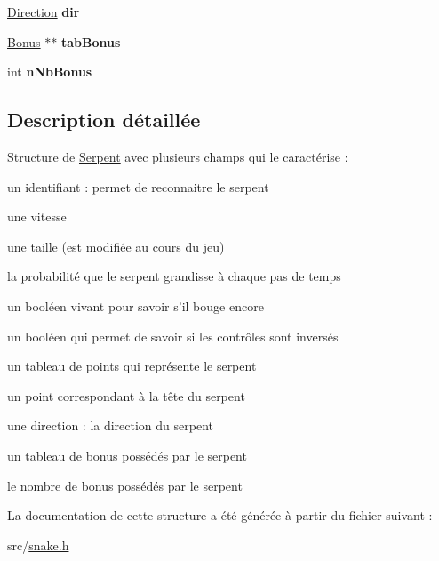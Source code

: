 \begin{DoxyCompactItemize}
\item 
\hypertarget{struct_serpent_a58d94fa8f7ddf189cd6eabdea4f2346c}{\hyperlink{snake_8h_a224b9163917ac32fc95a60d8c1eec3aa}{Direction} {\bfseries dir}}\label{struct_serpent_a58d94fa8f7ddf189cd6eabdea4f2346c}

\item 
\hypertarget{struct_serpent_a5caf2f6b95504582543aadf9250a9f1f}{\hyperlink{struct_bonus}{Bonus} $\ast$$\ast$ {\bfseries tab\-Bonus}}\label{struct_serpent_a5caf2f6b95504582543aadf9250a9f1f}

\item 
\hypertarget{struct_serpent_a8ac28cdfb3bb7a7409393a3e62d83897}{int {\bfseries n\-Nb\-Bonus}}\label{struct_serpent_a8ac28cdfb3bb7a7409393a3e62d83897}

\end{DoxyCompactItemize}


\subsection{Description détaillée}
Structure de \hyperlink{struct_serpent}{Serpent} avec plusieurs champs qui le caractérise \-:
\begin{DoxyItemize}
\item un identifiant \-: permet de reconnaitre le serpent
\item une vitesse
\item une taille (est modifiée au cours du jeu)
\item la probabilité que le serpent grandisse à chaque pas de temps
\item un booléen vivant pour savoir s'il bouge encore
\item un booléen qui permet de savoir si les contrôles sont inversés
\item un tableau de points qui représente le serpent
\item un point correspondant à la tête du serpent
\item une direction \-: la direction du serpent
\item un tableau de bonus possédés par le serpent
\item le nombre de bonus possédés par le serpent 
\end{DoxyItemize}

La documentation de cette structure a été générée à partir du fichier suivant \-:\begin{DoxyCompactItemize}
\item 
src/\hyperlink{snake_8h}{snake.\-h}\end{DoxyCompactItemize}
